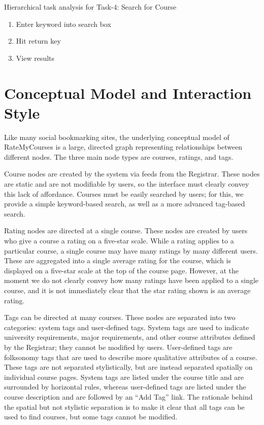\documentclass[12pt]{report}
\begin{document}
Hierarchical task analysis for Task-4: Search for Course
\begin{enumerate}
\item Enter keyword into search box
\item Hit return key
\item View results 
\end{enumerate}


\chapter{Conceptual Model and Interaction Style}

Like many social bookmarking sites, the underlying conceptual model of RateMyCourses is a large, directed graph representing relationships between different nodes. The three main node types are courses, ratings, and tags.

Course nodes are created by the system via feeds from the Registrar. These nodes are static and are not modifiable by users, so the interface must clearly convey this lack of affordance. Courses must be easily searched by users; for this, we provide a simple keyword-based search, as well as a more advanced tag-based search.

Rating nodes are directed at a single course. These nodes are created by users who give a course a rating on a five-star scale. While a rating applies to a particular course, a single course may have many ratings by many different users. These are aggregated into a single average rating for the course, which is displayed on a five-star scale at the top of the course page. However, at the moment we do not clearly convey how many ratings have been applied to a single course, and it is not immediately clear that the star rating shown is an average rating.

Tags can be directed at many courses. These nodes are separated into two categories: system tags and user-defined tags. System tags are used to indicate university requirements, major requirements, and other course attributes defined by the Registrar; they cannot be modified by users. User-defined tags are folksonomy tags that are used to describe more qualitative attributes of a course. These tags are not separated stylistically, but are instead separated spatially on individual course pages. System tags are listed under the course title and are surrounded by horizontal rules, whereas user-defined tags are listed under the course description and are followed by an ``Add Tag'' link. The rationale behind the spatial but not stylistic separation is to make it clear that all tags can be used to find courses, but some tags cannot be modified.
\end{document}

